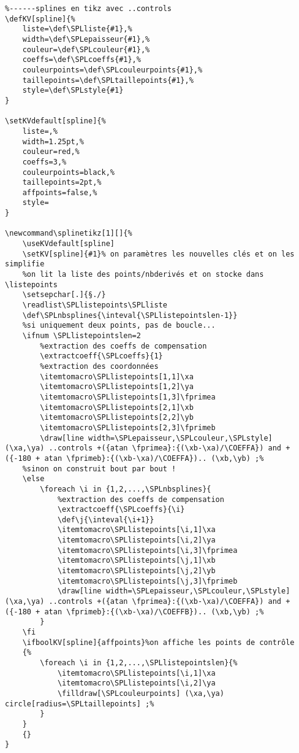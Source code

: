 \documentclass{article}
\begin{document}
\begin{verbatim}
%------splines en tikz avec ..controls
\defKV[spline]{%
	liste=\def\SPLliste{#1},%
	width=\def\SPLepaisseur{#1},%
	couleur=\def\SPLcouleur{#1},%
	coeffs=\def\SPLcoeffs{#1},%
	couleurpoints=\def\SPLcouleurpoints{#1},%
	taillepoints=\def\SPLtaillepoints{#1},%
	style=\def\SPLstyle{#1}
}

\setKVdefault[spline]{%
	liste=,%
	width=1.25pt,%
	couleur=red,%
	coeffs=3,%
	couleurpoints=black,%
	taillepoints=2pt,%
	affpoints=false,%
	style=
}

\newcommand\splinetikz[1][]{%
	\useKVdefault[spline]
	\setKV[spline]{#1}% on paramètres les nouvelles clés et on les simplifie
	%on lit la liste des points/nbderivés et on stocke dans \listepoints
	\setsepchar[.]{§./}
	\readlist\SPLlistepoints\SPLliste
	\def\SPLnbsplines{\inteval{\SPLlistepointslen-1}}
	%si uniquement deux points, pas de boucle...
	\ifnum \SPLlistepointslen=2
		%extraction des coeffs de compensation
		\extractcoeff{\SPLcoeffs}{1}
		%extraction des coordonnées
		\itemtomacro\SPLlistepoints[1,1]\xa
		\itemtomacro\SPLlistepoints[1,2]\ya
		\itemtomacro\SPLlistepoints[1,3]\fprimea
		\itemtomacro\SPLlistepoints[2,1]\xb
		\itemtomacro\SPLlistepoints[2,2]\yb
		\itemtomacro\SPLlistepoints[2,3]\fprimeb
		\draw[line width=\SPLepaisseur,\SPLcouleur,\SPLstyle] (\xa,\ya) ..controls +({atan \fprimea}:{(\xb-\xa)/\COEFFA}) and +({-180 + atan \fprimeb}:{(\xb-\xa)/\COEFFA}).. (\xb,\yb) ;%
	%sinon on construit bout par bout !
	\else
		\foreach \i in {1,2,...,\SPLnbsplines}{
			%extraction des coeffs de compensation
			\extractcoeff{\SPLcoeffs}{\i}
			\def\j{\inteval{\i+1}}
			\itemtomacro\SPLlistepoints[\i,1]\xa
			\itemtomacro\SPLlistepoints[\i,2]\ya
			\itemtomacro\SPLlistepoints[\i,3]\fprimea
			\itemtomacro\SPLlistepoints[\j,1]\xb
			\itemtomacro\SPLlistepoints[\j,2]\yb
			\itemtomacro\SPLlistepoints[\j,3]\fprimeb
			\draw[line width=\SPLepaisseur,\SPLcouleur,\SPLstyle] (\xa,\ya) ..controls +({atan \fprimea}:{(\xb-\xa)/\COEFFA}) and +({-180 + atan \fprimeb}:{(\xb-\xa)/\COEFFB}).. (\xb,\yb) ;%
		}
	\fi
	\ifboolKV[spline]{affpoints}%on affiche les points de contrôle
	{%
		\foreach \i in {1,2,...,\SPLlistepointslen}{%
			\itemtomacro\SPLlistepoints[\i,1]\xa
			\itemtomacro\SPLlistepoints[\i,2]\ya
			\filldraw[\SPLcouleurpoints] (\xa,\ya) circle[radius=\SPLtaillepoints] ;%
		}
	}
	{}
}
\end{verbatim}
\end{document}

